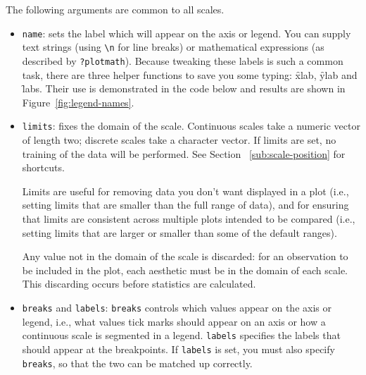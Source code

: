 The following arguments are common to all scales.

\begin{itemize}
  \item {\tt name}:  sets the label which will appear on the axis or legend. You can supply text strings (using \verb|\n| for line breaks) or mathematical expressions (as described by \verb|?plotmath|).  Because tweaking these labels is such a common task, there are three helper functions to save you some typing: \f{xlab}, \f{ylab} and \f{labs}.  Their use is demonstrated in the code below and results are shown in Figure~\ref{fig:legend-names}.   

    

  \item {\tt limits}: fixes the domain of the scale.   Continuous scales take a numeric vector of length two; discrete scales take a character vector. If limits are set, no training of the data will be performed.  See Section~ \ref{sub:scale-position} for shortcuts.  
  
  Limits are useful for removing data you don't want displayed in a plot (i.e., setting limits that are smaller than the full range of data), and for ensuring that limits are consistent across multiple plots intended to be compared (i.e., setting limits that are larger or smaller than some of the default ranges).  
  
  Any value not in the domain of the scale is discarded: for an observation to be included in the plot, each aesthetic must be in the domain of each scale.  This discarding occurs before statistics are calculated. 
  
  \item {\tt breaks} and {\tt labels}: {\tt breaks} controls which values appear on the axis or legend, i.e., what values tick marks should appear on an axis or how a continuous scale is segmented in a legend. {\tt labels} specifies the labels that should appear at the breakpoints. If {\tt labels} is set, you must also specify {\tt breaks}, so that the two can be matched up correctly.   


\end{itemize}
